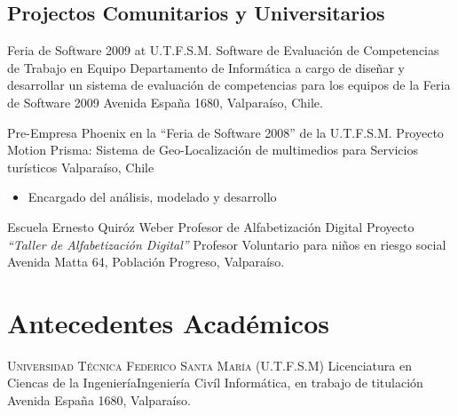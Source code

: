 \documentclass[11pt,letterpaper,roman]{moderncv}
\begin{document}
	

	
	
\subsection{Projectos Comunitarios y Universitarios}

 {Feria de Software 2009 at U.T.F.S.M.} {Software de
Evaluación de Competencias de Trabajo en Equipo} {Departamento de Informática}
{a cargo de diseñar y desarrollar un sistema de evaluación de competencias para
los equipos de la Feria de Software 2009} {Avenida Espa\~na 1680,  Valpara\'iso,
Chile.}

 {Pre-Empresa Phoenix en la ``Feria de Software
2008'' de la U.T.F.S.M.} {Proyecto Motion Prisma: Sistema de Geo-Localización de
multimedios para Servicios turísticos} {Valparaíso, Chile}{} {\begin{itemize}
\item Encargado del análisis, modelado y desarrollo \end{itemize}}
	
%

 {Escuela Ernesto Quir\'oz Weber} {Profesor de
Alfabetización Digital} {Proyecto \textit{``Taller de Alfabetizaci\'on
Digital''}} {Profesor Voluntario para niños en riesgo social} {Avenida Matta 64,
Poblaci\'on Progreso, Valpara\'iso.}
 

\section{Antecedentes Académicos}
 {\textsc{Universidad T\'ecnica Federico Santa
Mar\'ia (U.T.F.S.M)}} {Licenciatura en Ciencas de la Ingeniería}{Ingeniería
Civíl Informática, en trabajo de titulación} {} {Avenida España 1680,
Valparaíso.}
	
\end{document}
